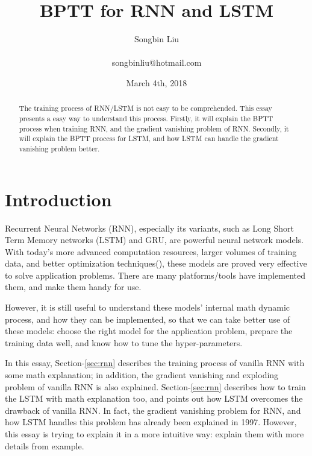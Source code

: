 \documentclass[english]{article}
\begin{document}


\author{Songbin Liu \\\\ songbinliu@hotmail.com} %
\title{BPTT for RNN and LSTM} %
\date{March 4th, 2018} %
\maketitle{} %

\begin{abstract}
The training process of RNN/LSTM is not easy to be comprehended. This essay presents a easy way to understand this process.
Firstly, it will explain the BPTT process when training RNN, and the gradient vanishing problem of RNN.  Secondly, it will explain the BPTT
process for LSTM, and how LSTM can handle the gradient vanishing problem better.

\end{abstract}

\section{Introduction}
Recurrent Neural Networks (RNN), especially its variants, such as Long Short Term Memory networks (LSTM\cite{LSTM1997}) and GRU\cite{gru2014},
are powerful neural network models. With today's more advanced computation resources, larger volumes of training data,
and better optimization techniques(\cite{dropout2014, norm2015, adaptive2016}), 
these models are proved very effective to solve application problems.  There are many
platforms/tools have implemented them, and make them handy for use.

However, it is still useful to understand these models' internal math dynamic process, and how they can be implemented, so that
we can take better use of these models: choose the right model for the application problem, prepare the training data well, and know how to
tune the hyper-parameters.

In this essay, Section-\ref{sec:rnn} describes the training process of vanilla RNN with some math explanation; 
in addition, the gradient vanishing and exploding problem of vanilla RNN is also explained.  Section-\ref{sec:rnn} describes how to
train the LSTM with math explanation too, and points out how LSTM overcomes the drawback of vanilla RNN. 
In fact, the gradient vanishing problem for RNN, and how LSTM handles this problem has already been explained in 1997\cite{LSTM1997}. 
However, this essay is trying to explain it in a more intuitive way: explain them with more details from example.
\end{document}
